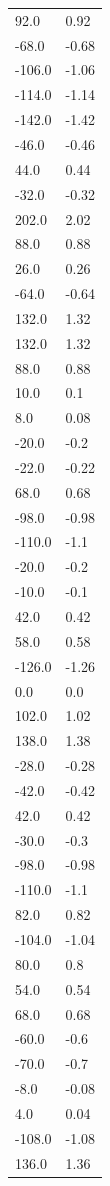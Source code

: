 \begin{longtable}{ll}
92.0 & 0.92 \\
-68.0 & -0.68 \\
-106.0 & -1.06 \\
-114.0 & -1.14 \\
-142.0 & -1.42 \\
-46.0 & -0.46 \\
44.0 & 0.44 \\
-32.0 & -0.32 \\
202.0 & 2.02 \\
88.0 & 0.88 \\
26.0 & 0.26 \\
-64.0 & -0.64 \\
132.0 & 1.32 \\
132.0 & 1.32 \\
88.0 & 0.88 \\
10.0 & 0.1 \\
8.0 & 0.08 \\
-20.0 & -0.2 \\
-22.0 & -0.22 \\
68.0 & 0.68 \\
-98.0 & -0.98 \\
-110.0 & -1.1 \\
-20.0 & -0.2 \\
-10.0 & -0.1 \\
42.0 & 0.42 \\
58.0 & 0.58 \\
-126.0 & -1.26 \\
0.0 & 0.0 \\
102.0 & 1.02 \\
138.0 & 1.38 \\
-28.0 & -0.28 \\
-42.0 & -0.42 \\
42.0 & 0.42 \\
-30.0 & -0.3 \\
-98.0 & -0.98 \\
-110.0 & -1.1 \\
82.0 & 0.82 \\
-104.0 & -1.04 \\
80.0 & 0.8 \\
54.0 & 0.54 \\
68.0 & 0.68 \\
-60.0 & -0.6 \\
-70.0 & -0.7 \\
-8.0 & -0.08 \\
4.0 & 0.04 \\
-108.0 & -1.08 \\
136.0 & 1.36 \\

\end{longtable}
